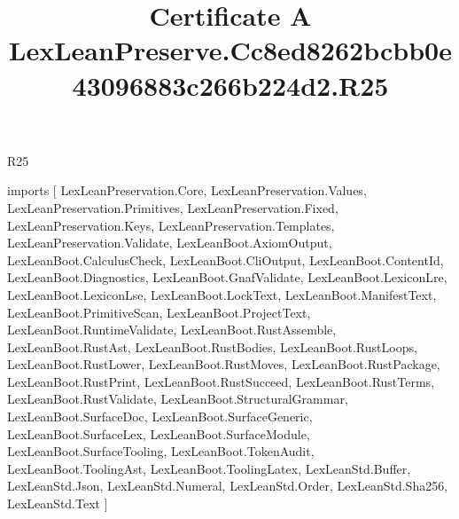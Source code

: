 \begin{lexlean}{R25}
\title{Certificate A LexLeanPreserve.Cc8ed8262bcbb0e43096883c266b224d2.R25}
\begin{coremodule}
imports [
  LexLeanPreservation.Core,
  LexLeanPreservation.Values,
  LexLeanPreservation.Primitives,
  LexLeanPreservation.Fixed,
  LexLeanPreservation.Keys,
  LexLeanPreservation.Templates,
  LexLeanPreservation.Validate,
  LexLeanBoot.AxiomOutput,
  LexLeanBoot.CalculusCheck,
  LexLeanBoot.CliOutput,
  LexLeanBoot.ContentId,
  LexLeanBoot.Diagnostics,
  LexLeanBoot.GnafValidate,
  LexLeanBoot.LexiconLre,
  LexLeanBoot.LexiconLse,
  LexLeanBoot.LockText,
  LexLeanBoot.ManifestText,
  LexLeanBoot.PrimitiveScan,
  LexLeanBoot.ProjectText,
  LexLeanBoot.RuntimeValidate,
  LexLeanBoot.RustAssemble,
  LexLeanBoot.RustAst,
  LexLeanBoot.RustBodies,
  LexLeanBoot.RustLoops,
  LexLeanBoot.RustLower,
  LexLeanBoot.RustMoves,
  LexLeanBoot.RustPackage,
  LexLeanBoot.RustPrint,
  LexLeanBoot.RustSucceed,
  LexLeanBoot.RustTerms,
  LexLeanBoot.RustValidate,
  LexLeanBoot.StructuralGrammar,
  LexLeanBoot.SurfaceDoc,
  LexLeanBoot.SurfaceGeneric,
  LexLeanBoot.SurfaceLex,
  LexLeanBoot.SurfaceModule,
  LexLeanBoot.SurfaceTooling,
  LexLeanBoot.TokenAudit,
  LexLeanBoot.ToolingAst,
  LexLeanBoot.ToolingLatex,
  LexLeanStd.Buffer,
  LexLeanStd.Json,
  LexLeanStd.Numeral,
  LexLeanStd.Order,
  LexLeanStd.Sha256,
  LexLeanStd.Text
]


\end{coremodule}
\end{lexlean}
